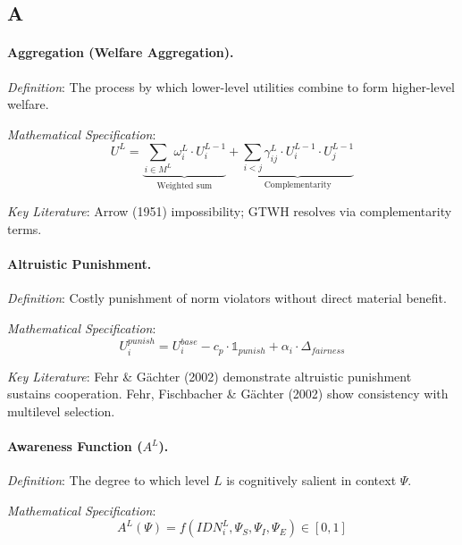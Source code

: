\subsection*{A}

\paragraph{Aggregation (Welfare Aggregation).}
\textit{Definition}: The process by which lower-level utilities combine to form 
higher-level welfare.

\textit{Mathematical Specification}:
\begin{equation}
U^L = \underbrace{\sum_{i \in M^L} \omega^L_i \cdot U^{L-1}_i}_{\text{Weighted sum}} + 
\underbrace{\sum_{i < j} \gamma^L_{ij} \cdot U^{L-1}_i \cdot U^{L-1}_j}_{\text{Complementarity}}
\end{equation}

\textit{Key Literature}: Arrow (1951) impossibility; GTWH resolves via 
complementarity terms.

\medskip

\paragraph{Altruistic Punishment.}
\textit{Definition}: Costly punishment of norm violators without direct material benefit.

\textit{Mathematical Specification}:
\begin{equation}
U_i^{punish} = U_i^{base} - c_p \cdot \mathbb{1}_{punish} + \alpha_i \cdot \Delta_{fairness}
\end{equation}

\textit{Key Literature}: Fehr \& Gächter (2002) demonstrate altruistic punishment 
sustains cooperation. Fehr, Fischbacher \& Gächter (2002) show consistency with 
multilevel selection.

\medskip

\paragraph{Awareness Function ($A^L$).}
\textit{Definition}: The degree to which level $L$ is cognitively salient in context $\Psi$.

\textit{Mathematical Specification}:
\begin{equation}
A^L(\Psi) = f\left( IDN^L_i, \Psi_S, \Psi_I, \Psi_E \right) \in [0, 1]
\end{equation}

